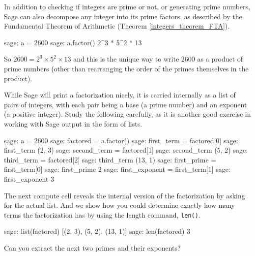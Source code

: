 %
\begin{sageverbatim}

\end{sageverbatim}
%
In addition to checking if integers are prime or not, or generating prime numbers, Sage can also decompose any integer into its prime factors, as described by the Fundamental Theorem of Arithmetic (Theorem \ref{integers_theorem_FTA}).
%
\begin{sageexample}
sage: a = 2600
sage: a.factor()
2^3 * 5^2 * 13
\end{sageexample}
%
So $2600 = 2^3\times 5^2\times 13$ and this is the unique way to write $2600$ as a product of prime numbers (other than rearranging the order of the primes themselves in the product).\par
%
While Sage will print a factorization nicely, it is carried internally as a list of pairs of integers, with each pair being a base (a prime number) and an exponent (a positive integer).  Study the following carefully, as it is another good exercise in working with Sage output in the form of lists.
%
\begin{sageexample}
sage: a = 2600
sage: factored = a.factor()
sage: first_term = factored[0]
sage: first_term
(2, 3)
sage: second_term = factored[1]
sage: second_term
(5, 2)
sage: third_term = factored[2]
sage: third_term
(13, 1)
sage: first_prime = first_term[0]
sage: first_prime
2
sage: first_exponent = first_term[1]
sage: first_exponent
3
\end{sageexample}
%
The next compute cell reveals the internal version of the factorization by asking for the actual list.  And we show how you could determine exactly how many terms the factorization has by using the length command, \verb?len()?.
%
\begin{sageexample}
sage: list(factored)
[(2, 3), (5, 2), (13, 1)]
sage: len(factored)
3
\end{sageexample}
%
Can you extract the next two primes and their exponents?
%
\begin{sageverbatim}
\end{sageverbatim}
%












